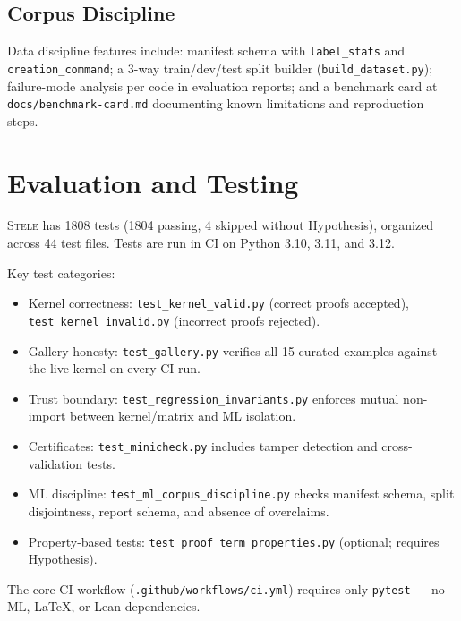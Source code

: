 \documentclass[11pt,a4paper]{article}
\theoremstyle{definition}
\theoremstyle{plain}
\newcommand{\stele}{\textsc{Stele}}
\begin{document}
\subsection{Corpus Discipline}

Data discipline features include: manifest schema with
\texttt{label\_stats} and \texttt{creation\_command}; a
3-way train/dev/test split builder (\texttt{build\_dataset.py});
failure-mode analysis per code in evaluation reports; and a
benchmark card at \texttt{docs/benchmark-card.md} documenting
known limitations and reproduction steps.

\section{Evaluation and Testing}
\label{sec:testing}

\stele{} has 1808 tests (1804 passing, 4 skipped without
Hypothesis), organized across 44 test files.
Tests are run in CI on Python 3.10, 3.11, and 3.12.

Key test categories:

\begin{itemize}
  \item Kernel correctness:
    \texttt{test\_kernel\_valid.py} (correct proofs accepted),
    \texttt{test\_kernel\_invalid.py} (incorrect proofs rejected).
  \item Gallery honesty: \texttt{test\_gallery.py} verifies all
    15 curated examples against the live kernel on every CI run.
  \item Trust boundary: \texttt{test\_regression\_invariants.py}
    enforces mutual non-import between kernel/matrix and ML isolation.
  \item Certificates: \texttt{test\_minicheck.py} includes tamper
    detection and cross-validation tests.
  \item ML discipline: \texttt{test\_ml\_corpus\_discipline.py}
    checks manifest schema, split disjointness, report schema, and
    absence of overclaims.
  \item Property-based tests: \texttt{test\_proof\_term\_properties.py}
    (optional; requires Hypothesis).
\end{itemize}

The core CI workflow (\texttt{.github/workflows/ci.yml}) requires
only \texttt{pytest} --- no ML, LaTeX, or Lean dependencies.
\end{document}
